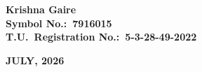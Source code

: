 \begin{center}
\vspace{0.2in}

{\fontsize{14}{18}\selectfont\textbf{Krishna Gaire}}\\[4pt]
{\fontsize{14}{18}\selectfont\textbf{Symbol No.:\ 7916015}}\\[4pt]
{\fontsize{14}{18}\selectfont\textbf{T.U.\ Registration No.:\ 5-3-28-49-2022}}

\vfill

{\fontsize{14}{18}\selectfont\textbf{JULY, 2026}}

\end{center}
\newpage